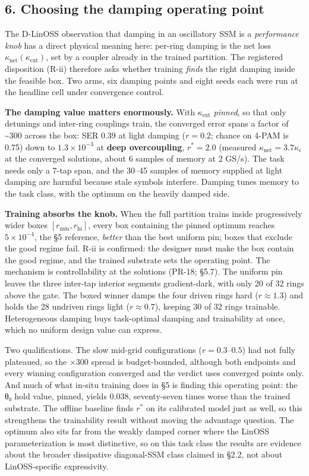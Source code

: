 \documentclass[
  10pt,
]{article}
\begin{document}
\subsection{6. Choosing the damping operating
point}\label{choosing-the-damping-operating-point}

The D-LinOSS observation that damping in an oscillatory SSM is a
\emph{performance knob} has a direct physical meaning here: per-ring
damping is the net loss \(\kappa_\text{net}(\kappa_\text{ext})\), set by
a coupler already in the trained partition. The registered disposition
(R-ii) therefore asks whether training \emph{finds} the right damping
inside the feasible box. Two arms, six damping points and eight seeds
each were run at the headline cell under convergence control.

\textbf{The damping value matters enormously.} With
\(\kappa_\text{ext}\) \emph{pinned}, so that only detunings and
inter-ring couplings train, the converged error spans a factor of
\textasciitilde300 across the box: SER 0.39 at light damping
(\(r = 0.2\); chance on 4-PAM is 0.75) down to \(1.3\times10^{-3}\) at
\textbf{deep overcoupling}, \(r^* = 2.0\) (measured
\(\kappa_\text{net} = 3.7\kappa_i\) at the converged solutions, about 6
samples of memory at 2 GS/s). The task needs only a 7-tap span, and the
30--45 samples of memory supplied at light damping are harmful because
stale symbols interfere. Damping tunes memory to the task class, with
the optimum on the heavily damped side.

\textbf{Training absorbs the knob.} When the full partition trains
inside progressively wider boxes \([r_\text{min}, r_\text{hi}]\), every
box containing the pinned optimum reaches \(5\times10^{-4}\), the §5
reference, \emph{better} than the best uniform pin; boxes that exclude
the good regime fail. R-ii is confirmed: the designer must make the box
contain the good regime, and the trained substrate sets the operating
point. The mechanism is controllability at the solutions (PR-18; §5.7).
The uniform pin leaves the three inter-tap interior segments
gradient-dark, with only 20 of 32 rings above the gate. The boxed winner
damps the four driven rings hard (\(r \approx 1.3\)) and holds the 28
undriven rings light (\(r \approx 0.7\)), keeping 30 of 32 rings
trainable. Heterogeneous damping buys task-optimal damping and
trainability at once, which no uniform design value can express.

Two qualifications. The slow mid-grid configurations
(\(r = 0.3\)--\(0.5\)) had not fully plateaued, so the ×300 spread is
budget-bounded, although both endpoints and every winning configuration
converged and the verdict uses converged points only. And much of what
in-situ training does in §5 is finding this operating point: the θ₀ hold
value, pinned, yields 0.038, seventy-seven times worse than the trained
substrate. The offline baseline finds \(r^*\) on its calibrated model
just as well, so this strengthens the trainability result without moving
the advantage question. The optimum also sits far from the weakly damped
corner where the LinOSS parameterization is most distinctive, so on this
task class the results are evidence about the broader dissipative
diagonal-SSM class claimed in §2.2, not about LinOSS-specific
expressivity.
\end{document}
